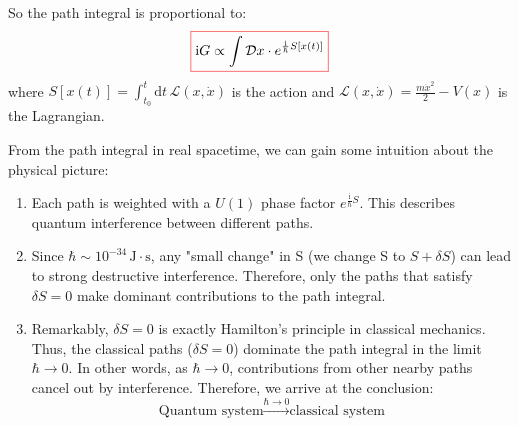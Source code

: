So the path integral is proportional to:
\begin{equation}
    \colorboxed{
    \mathrm{i}G \propto \int \mathcal{D}x \cdot e^{\frac{\mathrm{i}}{\hbar}S[x(t)]}
    }
\end{equation}
where $S[x(t)] = \int_{t_0}^{t} \mathrm{d}t \, \mathcal{L}(x, \dot{x})$ is the action
and $\mathcal{L}(x, \dot{x}) = \frac{m\dot{x}^2}{2} - V(x)$ is the Lagrangian.

From the path integral in real spacetime, we can gain some intuition about the physical picture:
\begin{enumerate}[(1)]
    \item Each path is weighted with a $U(1)$ phase factor $e^{\frac{\mathrm{i}}{\hbar}S}$.
    This describes quantum interference between different paths.
    \item Since $\hbar \sim 10^{-34} \, \mathrm{J \cdot s}$, any "small change" in S (we change S to $S+\delta S$)
    can lead to strong destructive interference.
    Therefore, only the paths that satisfy $\delta S=0$ make dominant contributions to the path integral.
    \item Remarkably, $\delta S=0$ is exactly Hamilton's principle in classical mechanics.
    Thus, the classical paths ($\delta S=0$) dominate the path integral in the limit $\hbar \to 0$. In other words,
    as $\hbar \to 0$, contributions from other nearby paths cancel out by interference.
    Therefore, we arrive at the conclusion:
    \begin{equation*}
    \text{Quantum system} \xrightarrow{\hbar \to 0} \text{classical system}
    \end{equation*}
\end{enumerate}

